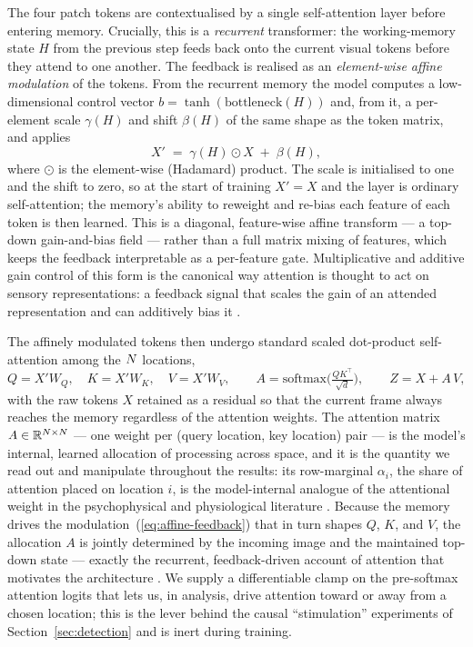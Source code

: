 The four patch tokens are contextualised by a single self-attention
layer before entering memory. Crucially, this is a \emph{recurrent}
transformer: the working-memory state $H$ from the previous step feeds
back onto the current visual tokens before they attend to one another.
The feedback is realised as an \emph{element-wise affine modulation} of
the tokens. From the recurrent memory the model computes a low-dimensional
control vector $b = \tanh(\mathrm{bottleneck}(H))$ and, from it, a
per-element scale $\gamma(H)$ and shift $\beta(H)$ of the same shape as
the token matrix, and applies
\begin{equation}
  X' \;=\; \gamma(H) \odot X \;+\; \beta(H),
  \label{eq:affine-feedback}
\end{equation}
where $\odot$ is the element-wise (Hadamard) product. The scale is
initialised to one and the shift to zero, so at the start of training
$X' = X$ and the layer is ordinary self-attention; the memory's ability
to reweight and re-bias each feature of each token is then learned. This
is a diagonal, feature-wise affine transform --- a top-down gain-and-bias
field --- rather than a full matrix mixing of features, which keeps the
feedback interpretable as a per-feature gate. Multiplicative and
additive gain control of this form is the canonical way attention is
thought to act on sensory representations: a feedback signal that scales
the gain of an attended representation and can additively bias it
\cite{reynolds_heeger2009_normalization, mcadams_maunsell1999_v4_tuning,
treue_martinez_trujillo1999_feature_attention}.

The affinely modulated tokens then undergo standard scaled dot-product
self-attention among the $N$ locations,
\begin{equation}
  Q = X'W_Q,\quad K = X'W_K,\quad V = X'W_V,\qquad
  A = \mathrm{softmax}\!\Big(\tfrac{QK^{\top}}{\sqrt{d}}\Big),\qquad
  Z = X + A\,V,
  \label{eq:self-attention}
\end{equation}
with the raw tokens $X$ retained as a residual so that the current frame
always reaches the memory regardless of the attention weights. The
attention matrix $A \in \mathbb{R}^{N \times N}$ --- one weight
per (query location, key location) pair --- is the model's internal,
learned allocation of processing across space, and it is the quantity we
read out and manipulate throughout the results: its row-marginal
$\alpha_i$, the share of attention placed on location $i$, is the
model-internal analogue of the attentional weight in the psychophysical
and physiological literature \cite{carrasco2011_visual_attention_25y,
reynolds_heeger2009_normalization}. Because the memory drives the
modulation~(\ref{eq:affine-feedback}) that in turn shapes $Q$, $K$, and
$V$, the allocation $A$ is jointly determined by the incoming image and
the maintained top-down state --- exactly the recurrent, feedback-driven
account of attention that motivates the architecture
\cite{ghose_maunsell2002_task_timing, sani2017_temporal_v4_gain}. We
supply a differentiable clamp on the pre-softmax attention logits that
lets us, in analysis, drive attention toward or away from a chosen
location; this is the lever behind the causal ``stimulation'' experiments
of Section~\ref{sec:detection} and is inert during training.

